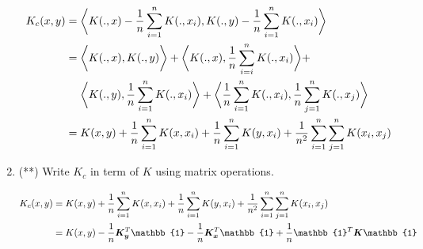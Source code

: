 \documentclass{article}
\begin{document}
\begin{enumerate}
        \begin{equation} 
            \begin{aligned} 
                K_c(x,y) &= \bigg \langle K(.,x)- \frac{1}{n}\sum_{i=1}^n K(.,x_i), K(.,y)-\frac{1}{n}\sum_{i=1}^n K(.,x_i) \bigg \rangle \notag \\
                &= \bigg \langle K(.,x), K(.,y) \bigg \rangle + \bigg \langle K(.,x), \frac{1}{n} \sum_{i=i}^n K(.,x_i) \bigg \rangle + \\ 
                &\ \ \ \ \bigg \langle K(.,y), \frac{1}{n}\sum_{i=1}^{n} K(.,x_i) \bigg \rangle + 
                \bigg \langle \frac{1}{n} \sum_{i=1}^{n} K(.,x_i), \frac{1}{n}\sum_{j=1}^{n} K(.,x_j) \bigg \rangle \\ 
                & = K(x,y) + \frac{1}{n}\sum_{i=1}^{n}K(x,x_i) + \frac{1}{n} \sum_{i=1}^{n} K(y,x_i) + 
                \frac{1}{n^2} \sum_{i=1}^{n} \sum_{j=1}^{n} K(x_i, x_j) 
            \end{aligned} 
        \end{equation}


    \item (**) Write $K_c$ in term of $K$ using matrix operations. 
    
        \begin{equation} 
            \begin{aligned}
                K_c(x,y) &= K(x,y) + \frac{1}{n}\sum_{i=1}^{n}K(x,x_i) + \frac{1}{n} \sum_{i=1}^{n} K(y,x_i) + 
                \frac{1}{n^2} \sum_{i=1}^{n} \sum_{j=1}^{n} K(x_i, x_j) \notag \\
                &= K(x,y) - \frac{1}{n}\bm{K_y}^T\mathbb{1} - \frac{1}{n}\bm{K_x}^T\mathbb{1} + \frac{1}{n}\mathbb{1}^T\bm{K}\mathbb{1}
            \end{aligned}
        \end{equation}
        

\end{enumerate}
\end{document}
